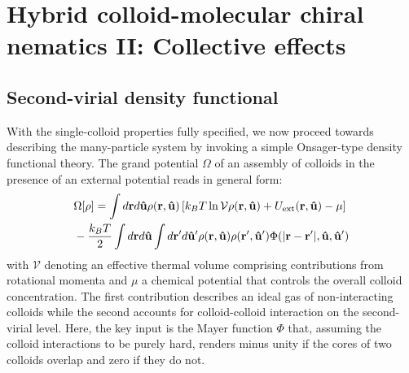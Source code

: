 
\chapter{Hybrid colloid-molecular chiral nematics II: Collective effects}


\section{Second-virial density functional }

 With the single-colloid properties fully specified, we now proceed towards describing the many-particle system by invoking a simple Onsager-type density functional theory. The grand potential $\Omega$ of an assembly of colloids in the presence of an external  potential  reads in general form:
 \begin{align}
 &  \Omega[\rho ]  = \int d {\bf r} d {\bf \hat{u}}  \rho({\bf r}, {\bf \hat{u}}) \left [k_{B}T \ln {\mathcal V}   \rho({\bf r}, {\bf \hat{u}})  +   U_{\rm ext}({\bf r}, {\bf \hat{u}}) - \mu  \right ] \nonumber \\
 & -\frac{k_{B}T}{2} \int d {\bf r} d {\bf \hat{u}} \int d {\bf r}^{\prime} d {\bf \hat{u}}^{\prime}  \rho({\bf r}, {\bf \hat{u}})  \rho({\bf r}^{\prime}, {\bf \hat{u}}^{\prime}) \Phi(|{\bf r} - {\bf r}^{\prime}|, {\bf \hat{u}}, {\bf \hat{u}}^{\prime} )
 \label{grandpot}
 \end{align}
 with ${\mathcal V}$ denoting an effective thermal volume comprising contributions from rotational momenta and $\mu$ a chemical potential that controls the overall colloid concentration.  The first contribution describes an ideal gas of  non-interacting colloids while the second accounts for colloid-colloid interaction on the second-virial level. Here, the key input is the Mayer function $\Phi$  that, assuming the colloid interactions to be purely hard, renders minus unity if the cores of two colloids overlap and zero if they do not.

